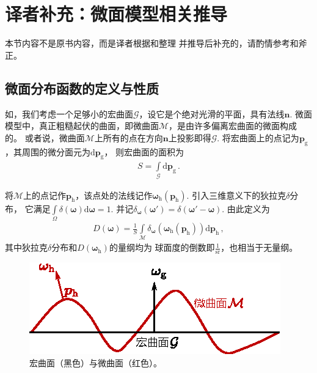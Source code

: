 \section{译者补充：微面模型相关推导}\label{sec:译者补充：微面模型相关推导}
\begin{remark}
    本节内容不是原书内容，而是译者根据\citet{heitz:hal-01024289}和\citet{10.5555/2383847.2383874}整理
    并推导后补充的，请酌情参考和斧正。
\end{remark}
\subsection{微面分布函数的定义与性质}\label{sub:微面分布函数的定义与性质}
如，我们考虑一个足够小的宏曲面$\mathcal{G}$，设它是个绝对光滑的平面，具有法线$\bm n$.
微面模型中，真正粗糙起伏的曲面，即微曲面$\mathcal{M}$，是由许多偏离宏曲面的微面构成的。
或者说，微曲面$\mathcal{M}$上所有的点在方向$\bm n$上投影即得$\mathcal{G}$.
将宏曲面上的点记为${\bm p}_{\mathrm{g}}$，其周围的微分面元为$\mathrm{d}{\bm p}_{\mathrm{g}}$，
则宏曲面的面积为
\begin{align}
    S=\int\limits_{\mathcal{G}}\mathrm{d}{\bm p}_{\mathrm{g}}\, .
\end{align}

将$\mathcal{M}$上的点记作${\bm p}_{\mathrm{h}}$，该点处的法线记作${\bm\omega}_{\mathrm{h}}({\bm p}_{\mathrm{h}})$.
引入三维意义下的狄拉克$\delta$分布，
它满足$\displaystyle\int\limits_{\varOmega}\delta({\bm\omega})\mathrm{d}{\bm\omega}=1$.
并记$\delta_{\bm\omega}({\bm\omega}')=\delta({\bm\omega}'-{\bm\omega})$.
由此定义为
\begin{align}\label{eq:08ex01-MicrosurfaceDistribution}
    D({\bm\omega})=\displaystyle\frac{1}{S}\int\limits_{\mathcal{M}}
    \delta_{\bm\omega}({\bm\omega}_{\mathrm{h}}({\bm p}_{\mathrm{h}}))
    \mathrm{d}{\bm p}_{\mathrm{h}}\, ,
\end{align}
其中狄拉克$\delta$分布和$D({\bm\omega}_{\mathrm{h}})$的量纲均为
球面度的倒数即$\displaystyle\frac{1}{\text{sr}}$，也相当于无量纲。

\begin{figure}[htbp]
    \centering
    \includegraphics[width=0.6\linewidth]{Pictures/chap08/macrosurfaceMicrosurface.eps}
    \caption{宏曲面（黑色）与微曲面（红色）。}
    \label{fig:08ex01-macrosurfaceMicrosurface}
\end{figure}

